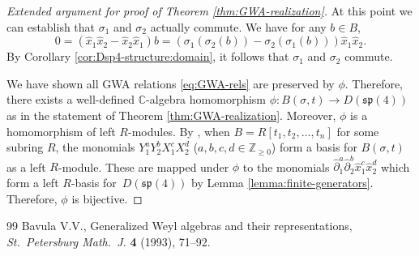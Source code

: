 \documentclass[10pt,a4paper]{article}
\numberwithin{equation}{section}
\begin{document}
\begin{proof}[Extended argument for proof of Theorem \ref{thm:GWA-realization}]
	At this point we can establish that $\sigma_1$ and $\sigma_2$ actually commute.
	We have for any $b\in B$,
	\[0=(\hat{x}_1\hat{x}_2 -\hat{x}_2\hat{x}_1)b = (\sigma_1(\sigma_2(b))-\sigma_2(\sigma_1(b)))\hat{x}_1\hat{x}_2.\]
	By Corollary \ref{cor:Dsp4-structure:domain}, it follows that $\sigma_1$ and $\sigma_2$ commute.
	
	We have shown all GWA relations \eqref{eq:GWA-rels} are preserved by $\phi$. Therefore, there exists a well-defined $\mathbb{C}$-algebra homomorphism $\phi\colon B(\sigma,t)\to D(\mathfrak{sp}(4))$ as in the statement of Theorem \ref{thm:GWA-realization}. Moreover, $\phi$ is a homomorphism of left $R$-modules.
	By \cite{bavula1992generalized}, when $B=R[t_1,t_2,\dots,t_n]$ for some subring $R$, the monomials $Y_1^aY_2^bX_1^cX_2^d$ ($a,b,c,d\in\mathbb{Z}_{\geq 0}$) form a basis for $B(\sigma,t)$ as a left $R$-module. These are mapped under $\phi$ to the monomials $\hat{\partial}_1^a\hat{\partial}_2^b\hat{x}_1^c\hat{x}_2^d$ which form a left $R$-basis for~$D(\mathfrak{sp}(4))$ by Lemma \ref{lemma:finite-generators}.
	Therefore, $\phi$ is bijective.
\end{proof}

\begin{thebibliography}{99}
Bavula V.V., Generalized {W}eyl algebras and their representations,
 \textit{St.~Petersburg Math.~J.} \textbf{4} (1993), 71--92.
\end{thebibliography}
\end{document}

